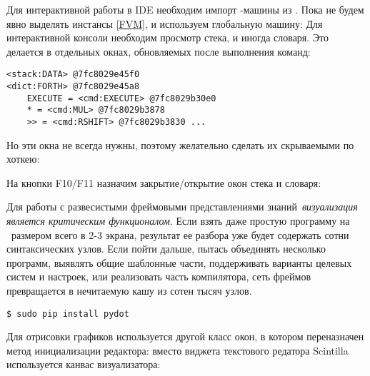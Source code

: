 \clearpage\noindent
Для интерактивной работы в IDE необходим импорт \F-машины из \metal.  
Пока не будем явно выделять инстансы  \ref{FVM}, и используем
глобальную машину:
\noindent
Для интерактивной консоли необходим просмотр стека, и иногда словаря. Это
делается в отдельных окнах, обновляемых после выполнения команд:
\begin{verbatim}
<stack:DATA> @7fc8029e45f0
<dict:FORTH> @7fc8029e45a8
    EXECUTE = <cmd:EXECUTE> @7fc8029b30e0
    * = <cmd:MUL> @7fc8029b3878
    >> = <cmd:RSHIFT> @7fc8029b3830 ...
\end{verbatim}

Но эти окна не всегда нужны, поэтому желательно сделать их скрываемыми по
хоткею:

\noindent
На кнопки F10/F11 назначим закрытие/открытие окон стека и словаря:


\clearpage
{}

Для работы с развесистыми фреймовыми представлениями знаний\ \emph{визуализация является
критическим функционалом}. Если взять даже простую программу на \emc\ размером
всего в 2-3 экрана, результат ее разбора уже будет содержать сотни
синтаксических узлов. Если пойти дальше, пытась объединять несколько программ,
выявлять общие шаблонные части, поддерживать варианты целевых систем и настроек,
или реализовать часть компилятора, сеть фреймов превращается в нечитаемую кашу
из сотен тысяч узлов.

\begin{verbatim}
$ sudo pip install pydot
\end{verbatim}

Для отрисовки графиков используется другой класс окон, в котором переназначен
метод инициализации редактора: вместо виджета текстового редатора Scintilla
используется канвас визуализатора:

\clearpage
{}

\secup

\secup